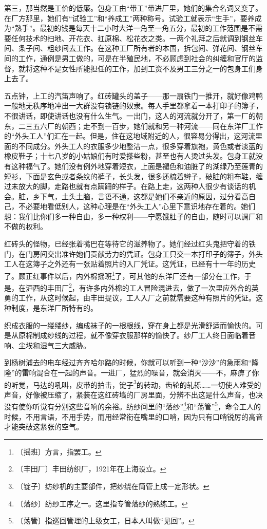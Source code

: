 \documentclass[12pt,UTF-8,openany]{ctexbook}
\begin{document}
\begin{normalsize}
    第三，那当然是工价的低廉。包身工由“带工”带进厂里，她们的集合名词又变了。在厂方那里，她们有“试验工”和“养成工”两种称号。试验工就表示“生手”，要养成为“熟手”。最初的钱是每天十二小时大洋一角至一角五分，最初的工作范围是不需要任何技术的扫地、开花衣、扛原棉、松花衣之类。一两个礼拜之后就调到钢丝车间、条子间、粗纱间去工作。在这种工厂所有者的本国，拆包间、弹花间、钢丝车间的工作，通例是男工做的，可是在半殖民地，不必顾虑到社会的纠缠和官厅的监督，就将这种不是女性所能担任的工作，加到工资不及男工三分之一的包身工们身上去了。
    
    五点钟，上工的汽笛声响了。红砖罐头的盖子——那一扇铁门一推开，就好像鸡鸭一般地无秩序地冲出一大群没有锁链的奴隶。每人手里都拿着一本打印子的簿子，不很讲话，即使讲话也没有什么生气。一出门，这人的河流就分开了，第一厂的朝东，二三五六厂的朝西；走不到一百步，她们就和另一种河流——同在东洋厂工作的“外头工人”们汇在一起。但是，住在这地域附近的人，很容易分得出，这河流里面的不同成分。外头工人的衣服多少地整洁一点，很多穿着旗袍，黄色或者淡蓝的橡皮鞋子；十七八岁的小姑娘们有时爱搽些粉，甚至也有人烫过头发。包身工就没有这种福气了。她们没有例外地穿着短衣，上面是褪色和油脏了的湖绿乃至莲青的短衫，下面是玄色或者条纹的裤子，长头发，很多还梳着辫子，破脏的粗布鞋，缠过未放大的脚，走路也就有点蹒跚的样子。在路上走，这两种人很少有谈话的机会。脏，乡下气，土头土脑，言语不通，这都是她们不亲近的原因，过分看高自己，不必要地看低别人，这种心理是在“外头工人”心里下意识地存在着的。她们想：我们比你们多一种自由，多一种权利——宁愿饿肚子的自由，随时可以调厂和不做的权利。
    
    红砖头的怪物，已经张着嘴巴在等待它的滋养物了。她们经过红头鬼把守着的铁门，在门房间交出准许她们贡献劳力的凭证。包身工只交一本打印子的簿子，外头工人在这簿子之外还有一张贴着照片的入厂凭证。这凭证，已经有十一年的历史了。顾正红事件以后，内外棉摇班\footnote{〔摇班〕方言，指罢工。}了，可其他的东洋厂还有一部分在工作，于是，在沪西的丰田厂\footnote{〔丰田厂〕丰田纺织厂，1921年在上海设立。}，有许多内外棉的工人冒险混进去，做了一次里应外合的英勇的工作，从这时候起，由丰田提议，工人入厂之前就需要这种有照片的凭证。这种制度，是东洋厂所特有的。
    
    织成衣服的一缕缕纱，编成袜子的一根根线，穿在身上都是光滑舒适而愉快的。可是从原棉制成纱线的过程，就不像穿衣服那样的愉快了。纱厂工人终日面临着音响、尘埃和湿气三大威胁。
    
    到杨树浦去的电车经过齐齐哈尔路的时候，你就可以听到一种“沙沙”的急雨和“隆隆”的雷响混合在一起的声音。一进厂，猛烈的噪音，就会消灭——不，麻痹了你的听觉，马达的吼叫，皮带的拍击，锭子\footnote{〔锭子〕纺纱机的主要部件，把纱绕在筒管上成一定形状。}的转动，齿轮的轧轹……一切使人难受的声音，好像被压缩了，紧装在这红砖墙的厂房里面，分辨不出这是什么声音，也决没有使你听觉有分别这些音响的余裕。纺纱间里的“落纱”\footnote{〔落纱〕纺纱工序之一。这里指专管落纱的熟练工。}和“荡管”\footnote{〔荡管〕指巡回管理的上级女工，日本人叫做“见回”。}，命令工人的时候，不用言语，不用手势，而用经常衔在嘴里的口哨，因为只有口哨锐厉的高音才能突破这紧张的空气。
    

\end{normalsize}
\end{document}
